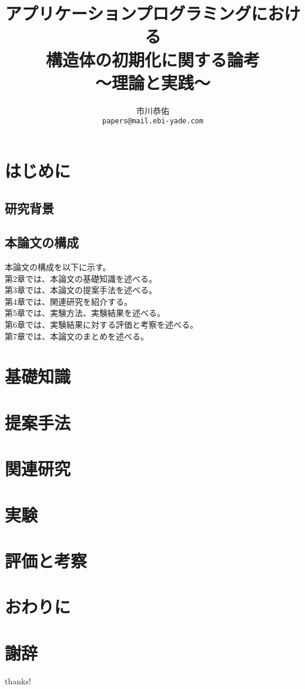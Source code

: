\documentclass[a4j,12pt]{jreport}
\title{
\LARGE{アプリケーションプログラミングにおける\\構造体の初期化に関する論考}\\
\Large{〜理論と実践〜}
}
\author{市川恭佑\\\texttt{papers@mail.ebi-yade.com}}
\date{}
\begin{document}
\maketitle
{}
\tableofcontents
\newpage
\listoffigures
\listoftables
\newpage
{}
\newpage

\chapter{はじめに}
\section{研究背景}
\section{本論文の構成}
本論文の構成を以下に示す。\\
第2章では、本論文の基礎知識を述べる。\\
第3章では、本論文の提案手法を述べる。\\
第4章では、関連研究を紹介する。\\
第5章では、実験方法、実験結果を述べる。\\
第6章では、実験結果に対する評価と考察を述べる。\\
第7章では、本論文のまとめを述べる。

\chapter{基礎知識}
\chapter{提案手法}
\chapter{関連研究}
\chapter{実験}
\chapter{評価と考察}
\chapter{おわりに}
\chapter*{謝辞}
thanks!

\newpage
\renewcommand{\bibname}{参考文献}
\begin{thebibliography}{2}
\end{thebibliography}

\newpage
\end{document}
